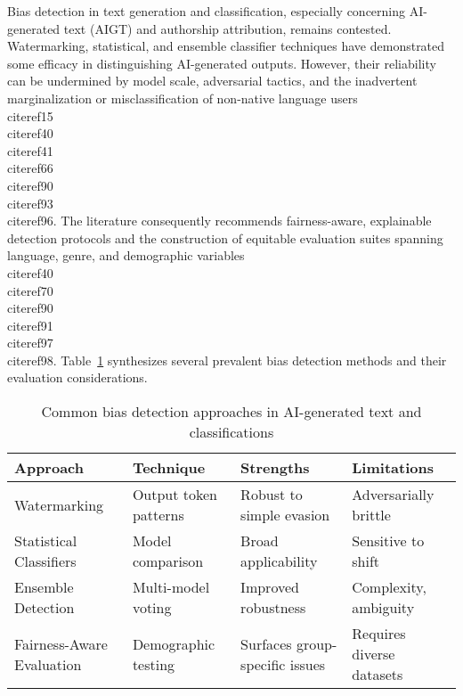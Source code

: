 \documentclass[11pt]{article}
\begin{document}
Bias detection in text generation and classification, especially concerning AI-generated text (AIGT) and authorship attribution, remains contested. Watermarking, statistical, and ensemble classifier techniques have demonstrated some efficacy in distinguishing AI-generated outputs. However, their reliability can be undermined by model scale, adversarial tactics, and the inadvertent marginalization or misclassification of non-native language users \\cite{ref15}\\cite{ref40}\\cite{ref41}\\cite{ref66}\\cite{ref90}\\cite{ref93}\\cite{ref96}. The literature consequently recommends fairness-aware, explainable detection protocols and the construction of equitable evaluation suites spanning language, genre, and demographic variables \\cite{ref40}\\cite{ref70}\\cite{ref90}\\cite{ref91}\\cite{ref97}\\cite{ref98}. Table~\ref{tab:bias_detection_methods} synthesizes several prevalent bias detection methods and their evaluation considerations.

\begin{table}[ht]
\centering
\caption{Common bias detection approaches in AI-generated text and classifications}
\label{tab:bias_detection_methods}
\begin{tabular}{|l|l|l|l|}
\hline
\textbf{Approach}        & \textbf{Technique}       & \textbf{Strengths}              & \textbf{Limitations}        \\
\hline
Watermarking             & Output token patterns    & Robust to simple evasion        & Adversarially brittle       \\
Statistical Classifiers  & Model comparison        & Broad applicability             & Sensitive to shift          \\
Ensemble Detection       & Multi-model voting      & Improved robustness             & Complexity, ambiguity       \\
Fairness-Aware Evaluation& Demographic testing     & Surfaces group-specific issues  & Requires diverse datasets   \\
\hline
\end{tabular}
\end{table}
\end{document}
